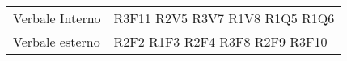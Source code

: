 \begin{center}
\begin{longtable}{C{6cm} C{6cm}}
Verbale Interno & R3F11 \newline
					R2V5 \newline
					R3V7 \newline
					R1V8 \newline
					R1Q5 \newline
					R1Q6 \\

Verbale esterno & 	R2F2 \newline
					R1F3 \newline
					R2F4 \newline
					R3F8 \newline
					R2F9 \newline
					R3F10 \\

\end{longtable}
\end{center}
